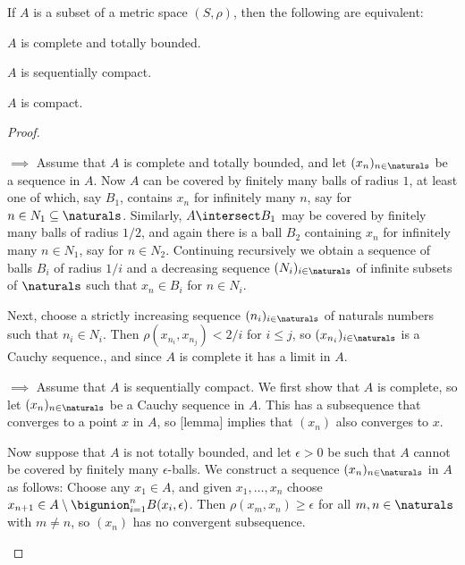 \documentclass[article, a4paper, 11pt, oneside]{memoir}
\numberwithin{equation}{chapter}
\begin{document}
\begin{theorem}
    If $A$ is a subset of a metric space $(S,\rho)$, then the following are equivalent:
    \begin{enumthm}
        \item \label{enum:complete-totally-bounded} $A$ is complete and totally bounded.
        \item \label{enum:sequentially-compact} $A$ is sequentially compact.
        \item \label{enum:compact} $A$ is compact.
    \end{enumthm}
\end{theorem}

\begin{proof}
\begin{proofsec}
    \item[\subcref{enum:complete-totally-bounded} $\implies$ \subcref{enum:sequentially-compact}]
    Assume that $A$ is complete and totally bounded, and let $(x_n)_{n\in\naturals}$ be a sequence in $A$. Now $A$ can be covered by finitely many balls of radius $1$, at least one of which, say $B_1$, contains $x_n$ for infinitely many $n$, say for $n \in N_1 \subseteq \naturals$. Similarly, $A \intersect B_1$ may be covered by finitely many balls of radius $1/2$, and again there is a ball $B_2$ containing $x_n$ for infinitely many $n \in N_1$, say for $n \in N_2$. Continuing recursively we obtain a sequence of balls $B_i$ of radius $1/i$ and a decreasing sequence $(N_i)_{i\in\naturals}$ of infinite subsets of $\naturals$ such that $x_n \in B_i$ for $n \in N_i$.

    Next, choose a strictly increasing sequence $(n_i)_{i\in\naturals}$ of naturals numbers such that $n_i \in N_i$. Then $\rho(x_{n_i}, x_{n_j}) < 2/i$ for $i \leq j$, so $(x_{n_i})_{i\in\naturals}$ is a Cauchy sequence., and since $A$ is complete it has a limit in $A$.

    \item[\subcref{enum:sequentially-compact} $\implies$ \subcref{enum:complete-totally-bounded}]
    Assume that $A$ is sequentially compact. We first show that $A$ is complete, so let $(x_n)_{n\in\naturals}$ be a Cauchy sequence in $A$. This has a subsequence that converges to a point $x$ in $A$, so [lemma] implies that $(x_n)$ also converges to $x$.
    
    Now suppose that $A$ is not totally bounded, and let $\epsilon > 0$ be such that $A$ cannot be covered by finitely many $\epsilon$-balls. We construct a sequence $(x_n)_{n\in\naturals}$ in $A$ as follows: Choose any $x_1 \in A$, and given $x_1, \ldots, x_n$ choose $x_{n+1} \in A \setminus \bigunion_{i=1}^n B(x_i,\epsilon)$. Then $\rho(x_m,x_n) \geq \epsilon$ for all $m,n \in \naturals$ with $m \neq n$, so $(x_n)$ has no convergent subsequence.
    

\end{proofsec}
\end{proof}
\end{document}

